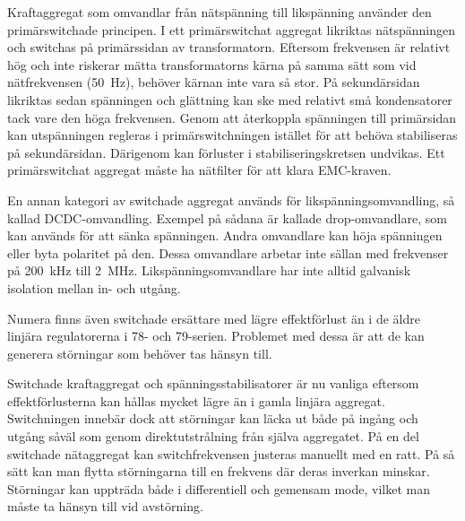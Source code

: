 Kraftaggregat som omvandlar från nätspänning till likspänning använder
den primärswitchade principen.
I ett primärswitchat aggregat likriktas nätspänningen och switchas på
primärssidan av transformatorn.
Eftersom frekvensen är relativt hög och inte riskerar mätta transformatorns
kärna på samma sätt som vid nätfrekvensen (\qty{50}{\hertz}), behöver kärnan
inte vara så stor.
På sekundärsidan likriktas sedan spänningen och glättning kan ske med relativt
små kondensatorer tack vare den höga frekvensen.
Genom att återkoppla spänningen till primärsidan kan utspänningen regleras i
primärswitchningen istället för att behöva stabiliseras på
sekundärsidan.
Därigenom kan förluster i stabiliseringskretsen undvikas.
Ett primärswitchat aggregat måste ha nätfilter för att klara EMC-kraven.

En annan kategori av switchade aggregat används för likspänningsomvandling, så
kallad DCDC-om\-vand\-ling.
Exempel på sådana är kallade drop-omvandlare, som kan används för att sänka
spänningen.
Andra omvandlare kan höja spänningen eller byta polaritet på den.
Dessa omvandlare arbetar inte sällan med frekvenser på \qty{200}{\kilo\hertz}
till \qty{2}{\mega\hertz}.
Likspänningsomvandlare har inte alltid galvanisk isolation mellan in- och utgång.

Numera finns även switchade ersättare med lägre effektförlust än i de äldre
linjära regulatorerna i 78- och 79-serien.
Problemet med dessa är att de kan generera störningar som behöver tas hänsyn
till.

Switchade kraftaggregat och spänningsstabilisatorer är nu vanliga eftersom
effektförlusterna kan hållas mycket lägre än i gamla linjära aggregat.
Switchningen innebär dock att störningar kan läcka ut både på ingång och utgång
såväl som genom direktutstrålning från själva aggregatet.
På en del switchade nätaggregat kan switchfrekvensen justeras manuellt med en
ratt.
På så sätt kan man flytta störningarna till en frekvens där deras inverkan
minskar.
Störningar kan uppträda både i differentiell och gemensam mode, vilket man måste
ta hänsyn till vid avstörning.
